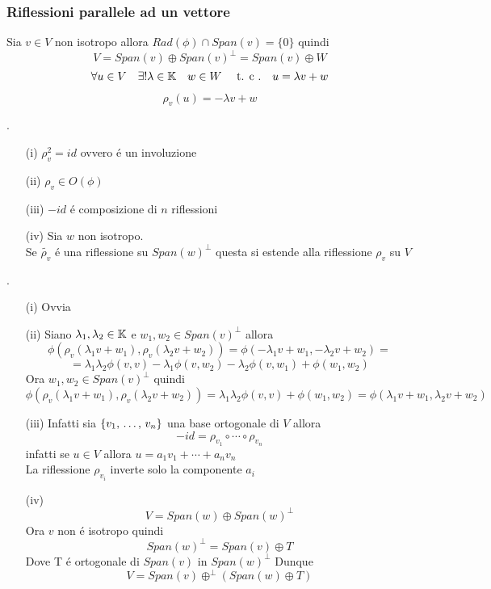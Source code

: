 \subsubsection{Riflessioni parallele ad un vettore}
Sia $v \in V$ non isotropo allora $Rad (\phi) \cap Span(v) =\{0 \} $ quindi 
$$ V = Span(v)\oplus Span(v)^\perp= Span (v)  \oplus W $$
$$ \forall u \in V  \quad \exists ! \lambda\in \mathbb{K} \quad w \in W \quad \text{ t. c .} \quad u = \lambda v + w $$
\begin{defn}
$$ \rho_v(u) = - \lambda v + w$$ 
\end{defn}
\begin{prop}\label{prop} .
\begin{itemize}
\item[(i)] $ \rho_v^2 = id $ ovvero \'e un involuzione 
\item[(ii)] $\rho_v \in O(\phi) $
\item[(iii)]$-id$ \'e composizione di $n$ riflessioni
\item[(iv)] Sia $w $ non isotropo.\\
Se $ \tilde{\rho_v} $ \'e una riflessione su $ Span(w)^\perp $ questa si estende alla riflessione $\rho _v$ su $V$
\end{itemize}
\proof .\begin{itemize}
\item[(i)]Ovvia
\item[(ii)]Siano $\lambda_1 , \lambda_2 \in \mathbb{K} $ e $w_1, w_2 \in Span(v)^\perp$ allora 
$$ \phi\left( \rho_v( \lambda_1 v + w_1 ), \rho_v( \lambda_2 v + w_2) \right) = \phi(-\lambda_1 v + w_1 , - \lambda_2 v + w_2 ) = $$
$$=\lambda_1 \lambda_2 \phi(v,v) - \lambda_1 \phi(v,w_2) -\lambda_2\phi(v,w_1) + \phi(w_1, w_2 )  $$ 
Ora $w_1, w_2 \in Span(v)^\perp $ quindi
$$\phi\left( \rho_v( \lambda_1 v + w_1 ), \rho_v( \lambda_2 v + w_2) \right) =\lambda_1 \lambda_2 \phi(v,v) + \phi(w_1, w_2 )=\phi(\lambda_1 v + w_1 , \lambda_2 v + w_2 )$$
\item[(iii)]
Infatti sia $\{ v_1, \, \dots , \, v_n \} $ una base ortogonale di $V$ allora
$$ - id = \rho_{v_1 } \circ \cdots \circ \rho_{v_n } $$
infatti se $ u \in V $ allora $u= a_1 v_1 + \cdots + a_n v_n $\\ La riflessione $\rho_{v_i} $ inverte solo la componente $a_i$
\item[(iv)] 
$$ V = Span(w)\oplus Span(w)^\perp$$
Ora $v$ non \'e isotropo quindi 
$$ Span(w)^\perp = Span(v)\oplus T $$
Dove T \'e ortogonale di $Span(v)$ in $Span(w)^\perp $
Dunque 
$$ V = Span(v) \oplus^\perp ( Span(w)\oplus T)$$
\end{itemize}
\endproof
\end{prop}

